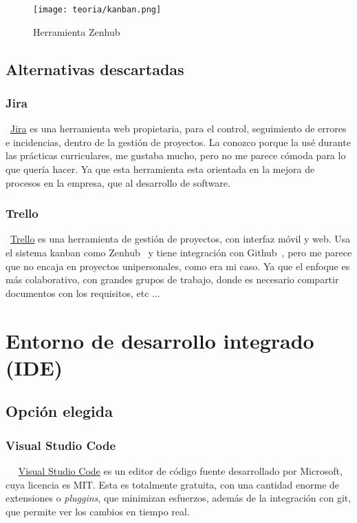 \begin{figure}[h]
	\centering
	\texttt{[image: teoria/kanban.png]}
	\caption{Herramienta Zenhub}\label{fig:zenhub}
\end{figure}

\subsection{Alternativas descartadas}

\subsubsection{Jira}
~\href{https://www.atlassian.com/es/software/jira}{Jira} es una herramienta web propietaria, para el control, seguimiento de errores e incidencias, dentro de la gestión de proyectos. La conozco porque la usé durante las prácticas curriculares, me gustaba mucho, pero no me parece cómoda para lo que quería hacer. Ya que esta herramienta esta orientada en la mejora de procesos en la empresa, que al desarrollo de software.

\subsubsection{Trello}
~\href{https://trello.com/es}{Trello} es una herramienta de gestión de proyectos, con interfaz móvil y web. Usa el sistema kanban como Zenhub~\pageref{zenhub} y tiene integración con Github~\pageref{github}, pero me parece que no encaja en proyectos unipersonales, como era mi caso. Ya que el enfoque es más colaborativo, con grandes grupos de trabajo, donde es necesario compartir documentos con los requisitos, etc ...

\section{Entorno de desarrollo integrado (IDE)}

\subsection{Opción elegida}

\subsubsection{Visual Studio Code}~\label{visual}
~\href{https://code.visualstudio.com/}{Visual Studio Code} es un editor de código fuente desarrollado por Microsoft, cuya licencia es MIT. Esta es totalmente gratuita, con una cantidad enorme de extensiones o \emph{pluggins}, que minimizan esfuerzos, además de la integración con git, que permite ver los cambios en tiempo real. 

